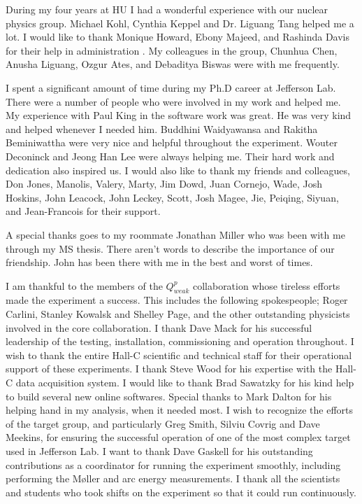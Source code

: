 During my four years at HU I had a wonderful experience with our nuclear physics group. Michael Kohl, Cynthia Keppel and Dr. Liguang Tang helped me a lot. I would like to thank Monique Howard, Ebony Majeed, and Rashinda Davis for their help in administration . My colleagues in the group, Chunhua Chen, Anusha Liguang, Ozgur Ates, and Debaditya Biswas were with me frequently. 

I spent a significant amount of time during my Ph.D career at Jefferson Lab. There were a number of people who were involved in my work and helped me. My experience with Paul King in the software work was great. He was very kind and helped whenever I needed him. Buddhini Waidyawansa and Rakitha Beminiwattha were very nice and helpful throughout the experiment. Wouter Deconinck and Jeong Han Lee were always helping me. Their hard work and dedication also inspired us. I would also like to thank my friends and colleagues, Don Jones, Manolis, Valery, Marty, Jim Dowd, Juan Cornejo, Wade, Josh Hoskins, John Leacock, John Leckey, Scott, Josh Magee, Jie, Peiqing, Siyuan, and Jean-Francois for their support. 

A special thanks goes to my roommate Jonathan Miller who was been with me through my MS thesis. There aren't words to describe the importance of our friendship. John has been there with me in the best and worst of times.

I am thankful to the members of the $Q^p_{weak}$ collaboration whose tireless efforts made the experiment a success. This includes the following spokespeople; Roger Carlini, Stanley Kowalsk and Shelley Page, and the other outstanding physicists involved in the core collaboration. I thank Dave Mack for his successful leadership of the testing, installation, commissioning and operation throughout. I wish to thank the entire Hall-C scientific and technical staff for their operational support of these experiments. I thank Steve Wood for his expertise with the Hall-C data acquisition system. I would like to thank Brad Sawatzky for his kind help to build several new online softwares. Special thanks to Mark Dalton for his helping hand in my analysis, when it needed most. I wish to recognize the efforts of the target group, and particularly Greg Smith, Silviu Covrig and Dave Meekins, for ensuring the successful operation of one of the most complex target used in Jefferson Lab. I want to thank Dave Gaskell for his outstanding contributions as a coordinator for running the experiment smoothly, including performing the M{\o}ller and arc energy measurements. I thank all the scientists and students who took shifts on the experiment so that it could run continuously.

